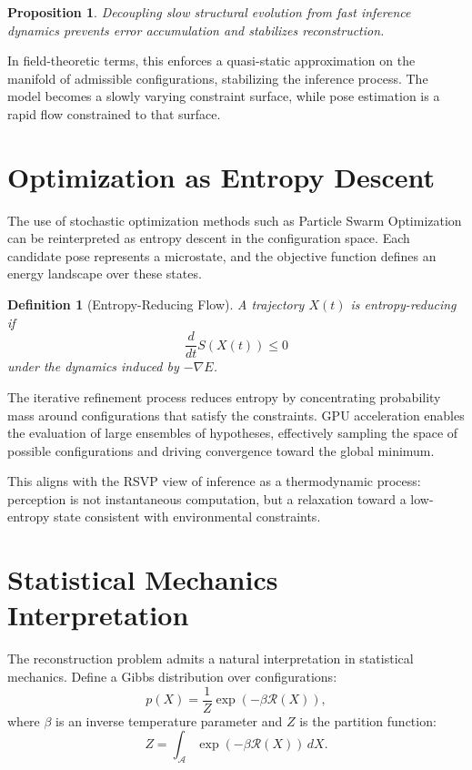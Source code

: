 \documentclass[12pt]{article}
\newtheorem{definition}{Definition}
\newtheorem{proposition}{Proposition}
\begin{document}
\begin{proposition}
Decoupling slow structural evolution from fast inference dynamics prevents error accumulation and stabilizes reconstruction.
\end{proposition}

In field-theoretic terms, this enforces a quasi-static approximation on the manifold of admissible configurations, stabilizing the inference process. The model becomes a slowly varying constraint surface, while pose estimation is a rapid flow constrained to that surface.

\section{Optimization as Entropy Descent}

The use of stochastic optimization methods such as Particle Swarm Optimization can be reinterpreted as entropy descent in the configuration space. Each candidate pose represents a microstate, and the objective function defines an energy landscape over these states.

\begin{definition}[Entropy-Reducing Flow]
A trajectory $X(t)$ is entropy-reducing if
\[
\frac{d}{dt} S(X(t)) \leq 0
\]
under the dynamics induced by $-\nabla E$.
\end{definition}

The iterative refinement process reduces entropy by concentrating probability mass around configurations that satisfy the constraints. GPU acceleration enables the evaluation of large ensembles of hypotheses, effectively sampling the space of possible configurations and driving convergence toward the global minimum.

This aligns with the RSVP view of inference as a thermodynamic process: perception is not instantaneous computation, but a relaxation toward a low-entropy state consistent with environmental constraints.

\section{Statistical Mechanics Interpretation}

The reconstruction problem admits a natural interpretation in statistical mechanics. Define a Gibbs distribution over configurations:
\[
p(X) = \frac{1}{Z} \exp\left(-\beta \mathcal{R}(X)\right),
\]
where $\beta$ is an inverse temperature parameter and $Z$ is the partition function:
\[
Z = \int_{\mathcal{A}} \exp\left(-\beta \mathcal{R}(X)\right)\, dX.
\]
\end{document}
